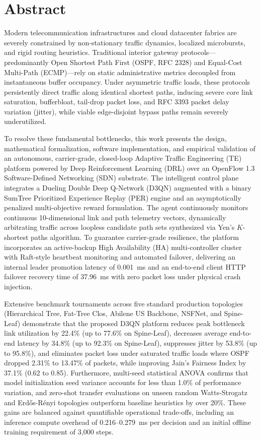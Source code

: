 \documentclass[12pt,a4paper,oneside]{report}
\begin{document}
\chapter*{Abstract}

Modern telecommunication infrastructures and cloud datacenter fabrics are severely constrained by non-stationary traffic dynamics, localized microbursts, and rigid routing heuristics. Traditional interior gateway protocols---predominantly Open Shortest Path First (OSPF, RFC 2328) and Equal-Cost Multi-Path (ECMP)---rely on static administrative metrics decoupled from instantaneous buffer occupancy. Under asymmetric traffic loads, these protocols persistently direct traffic along identical shortest paths, inducing severe core link saturation, bufferbloat, tail-drop packet loss, and RFC 3393 packet delay variation (jitter), while viable edge-disjoint bypass paths remain severely underutilized.

To resolve these fundamental bottlenecks, this work presents the design, mathematical formalization, software implementation, and empirical validation of an autonomous, carrier-grade, closed-loop Adaptive Traffic Engineering (TE) platform powered by Deep Reinforcement Learning (DRL) over an OpenFlow 1.3 Software-Defined Networking (SDN) substrate. The intelligent control plane integrates a Dueling Double Deep Q-Network (D3QN) augmented with a binary SumTree Prioritized Experience Replay (PER) engine and an asymptotically penalized multi-objective reward formulation. The agent continuously monitors continuous 10-dimensional link and path telemetry vectors, dynamically arbitrating traffic across loopless candidate path sets synthesized via Yen's $K$-shortest paths algorithm. To guarantee carrier-grade resilience, the platform incorporates an active-backup High Availability (HA) multi-controller cluster with Raft-style heartbeat monitoring and automated failover, delivering an internal leader promotion latency of 0.001~ms and an end-to-end client HTTP failover recovery time of 37.96~ms with zero packet loss under physical crash injection.

Extensive benchmark tournaments across five standard production topologies (Hierarchical Tree, Fat-Tree Clos, Abilene US Backbone, NSFNet, and Spine-Leaf) demonstrate that the proposed D3QN platform reduces peak bottleneck link utilization by 22.4\% (up to 77.6\% on Spine-Leaf), decreases average end-to-end latency by 34.8\% (up to 92.3\% on Spine-Leaf), suppresses jitter by 53.8\% (up to 95.8\%), and eliminates packet loss under saturated traffic loads where OSPF dropped 2.31\% to 13.47\% of packets, while improving Jain's Fairness Index by 37.1\% (0.62 to 0.85). Furthermore, multi-seed statistical ANOVA confirms that model initialization seed variance accounts for less than 1.0\% of performance variation, and zero-shot transfer evaluations on unseen random Watts-Strogatz and Erd\H{o}s-R\'{e}nyi topologies outperform baseline heuristics by over 20\%. These gains are balanced against quantifiable operational trade-offs, including an inference compute overhead of 0.216--0.279~ms per decision and an initial offline training requirement of 3,000 steps.
\end{document}
